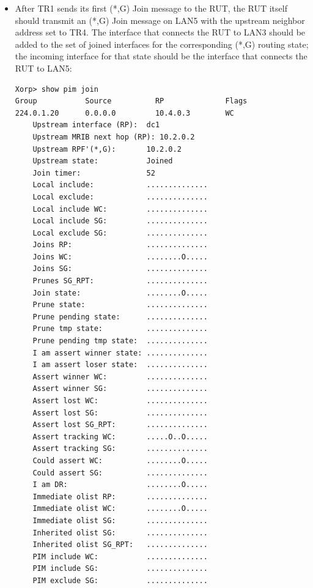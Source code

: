 \documentclass[11pt]{report}
\begin{document}


\begin{itemize}

  \item After TR1 sends its first (*,G) Join message to the RUT, the RUT
  itself should transmit an (*,G) Join message on LAN5 with the upstream
  neighbor address set to TR4. The interface that connects the RUT to LAN3
  should be added to the set of joined interfaces for the corresponding
  (*,G) routing state; the incoming interface for that state should be the
  interface that connects the RUT to LAN5:

\begin{verbatim}
Xorp> show pim join
Group           Source          RP              Flags
224.0.1.20      0.0.0.0         10.4.0.3        WC   
    Upstream interface (RP):  dc1
    Upstream MRIB next hop (RP): 10.2.0.2
    Upstream RPF'(*,G):       10.2.0.2
    Upstream state:           Joined 
    Join timer:               52
    Local include:            ..............
    Local exclude:            ..............
    Local include WC:         ..............
    Local include SG:         ..............
    Local exclude SG:         ..............
    Joins RP:                 ..............
    Joins WC:                 ........O.....
    Joins SG:                 ..............
    Prunes SG_RPT:            ..............
    Join state:               ........O.....
    Prune state:              ..............
    Prune pending state:      ..............
    Prune tmp state:          ..............
    Prune pending tmp state:  ..............
    I am assert winner state: ..............
    I am assert loser state:  ..............
    Assert winner WC:         ..............
    Assert winner SG:         ..............
    Assert lost WC:           ..............
    Assert lost SG:           ..............
    Assert lost SG_RPT:       ..............
    Assert tracking WC:       .....O..O.....
    Assert tracking SG:       ..............
    Could assert WC:          ........O.....
    Could assert SG:          ..............
    I am DR:                  ........O.....
    Immediate olist RP:       ..............
    Immediate olist WC:       ........O.....
    Immediate olist SG:       ..............
    Inherited olist SG:       ..............
    Inherited olist SG_RPT:   ..............
    PIM include WC:           ..............
    PIM include SG:           ..............
    PIM exclude SG:           ..............
\end{verbatim}


\end{itemize}
\end{document}
